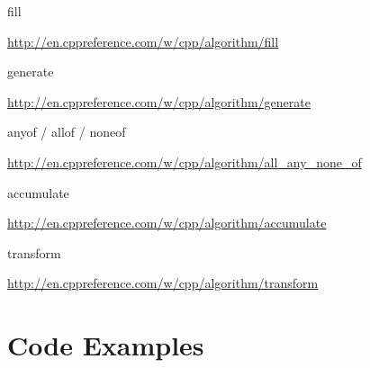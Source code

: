 \documentclass{beamer}
\begin{document}
\begin{frame}{fill}
	\bigskip
	\begin{center}
		\tiny \url{http://en.cppreference.com/w/cpp/algorithm/fill}
	\end{center}
\end{frame}

\begin{frame}{generate}
	\bigskip
	\begin{center}
		\tiny \url{http://en.cppreference.com/w/cpp/algorithm/generate}
	\end{center}
\end{frame}

\begin{frame}{any\textunderscore of / all\textunderscore of / none\textunderscore of}
	\bigskip
	\begin{center}
		\tiny \url{http://en.cppreference.com/w/cpp/algorithm/all_any_none_of}
	\end{center}
\end{frame}

\begin{frame}{accumulate}
\bigskip
	\begin{center}
		\tiny \url{http://en.cppreference.com/w/cpp/algorithm/accumulate}
	\end{center}
\end{frame}

\begin{frame}{transform}
\bigskip
	\begin{center}
		\tiny \url{http://en.cppreference.com/w/cpp/algorithm/transform}
	\end{center}
\end{frame}

\section{Code Examples}

\end{document}
